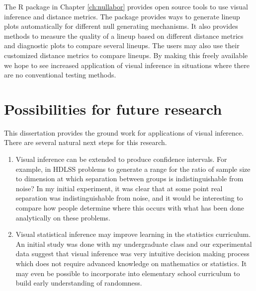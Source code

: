 The R package in Chapter \ref{ch:nullabor} provides open source tools to use visual inference and distance metrics. The package provides ways to generate lineup plots automatically for different null generating mechanisms. It also provides methods to measure the quality of a lineup based on different distance metrics and diagnostic plots to compare several lineups. The users may also use their customized distance metrics to compare lineups. By making this freely available we hope  to see increased application of visual inference in situations where there are no conventional testing methods.

\section{Possibilities for future research}

This dissertation provides the ground work for applications of visual inference. There are several natural next steps for this research. 

\begin{enumerate} 
\item Visual inference can be extended to produce confidence intervals. For example, in HDLSS problems to generate a range for the ratio of sample size to dimension at which separation between groups is indistinguishable from noise? In my initial experiment, it was clear that at some point real separation was indistinguishable from noise, and it would be interesting to compare how people determine where this occurs with what has been done analytically on these problems.  
\item Visual statistical inference may improve learning in the statistics curriculum. An initial study was done with my undergraduate class and our experimental data suggest that visual inference was very intuitive decision making process which does not require advanced knowledge on mathematics or statistics. It may even be possible to incorporate into elementary school curriculum to build early understanding of randomness. 
\end{enumerate}